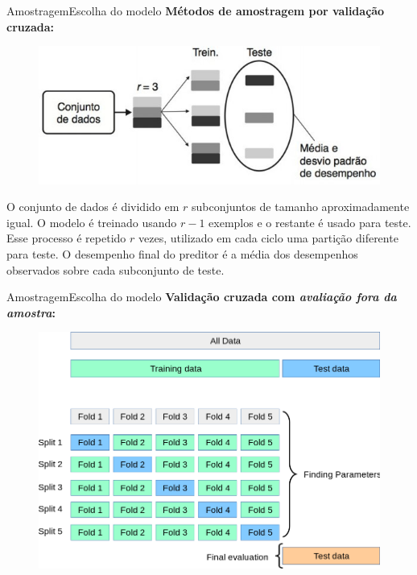 \documentclass[t]{beamer}
\begin{document}

\begin{ftst}{Amostragem}{Escolha do modelo}
\justifying
\textbf{Métodos de amostragem por validação cruzada:}
\vone
\begin{figure}
    \centering
    \includegraphics[scale=0.5]{Figuras/slide04_04.jpg}
\end{figure}
\small
O conjunto de dados é dividido em $r$ subconjuntos de tamanho aproximadamente igual. O modelo é treinado usando $r-1$ exemplos e o restante é usado para teste. Esse processo é repetido $r$ vezes, utilizado em cada ciclo uma partição diferente para teste.
\vone
O desempenho final do preditor é a média dos desempenhos observados sobre cada subconjunto de teste.

\end{ftst}


\begin{ftst}{Amostragem}{Escolha do modelo}
\justifying
\textbf{Validação cruzada com \textit{avaliação fora da amostra}:}

\begin{figure}
    \centering
    \includegraphics[scale=0.3]{Figuras/cross_validation.png}
\end{figure}



\end{ftst}
\end{document}
